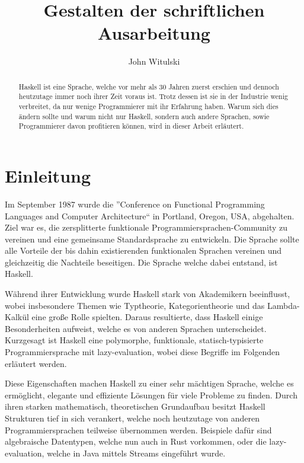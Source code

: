\documentclass{hhuarticle}
\title{Gestalten der schriftlichen Ausarbeitung}
\author{John Witulski} %
\begin{document}
  \maketitle

  \begin{abstract}
    Haskell ist eine Sprache, welche vor mehr als 30 Jahren zuerst erschien
    und dennoch heutzutage immer noch ihrer Zeit voraus ist.
    Trotz dessen ist sie in der Industrie wenig verbreitet, da nur
    wenige Programmierer mit ihr Erfahrung haben.
    Warum sich dies ändern sollte und warum nicht nur Haskell, sondern
    auch andere Sprachen, sowie Programmierer davon profitieren können,
    wird in dieser Arbeit erläutert.
  \end{abstract}

\tableofcontents


  \section{Einleitung}

  Im September 1987 wurde die
  ''Conference on Functional Programming Languages and Computer Architecture``
  in Portland, Oregon, USA, abgehalten. Ziel war es, die zersplitterte
  funktionale Programmiersprachen-Community zu vereinen und eine
  gemeinsame Standardsprache zu entwickeln.
  Die Sprache sollte alle Vorteile der bis dahin existierenden
  funktionalen Sprachen vereinen und gleichzeitig die Nachteile
  beseitigen.
  Die Sprache welche dabei entstand, ist Haskell.

  Während ihrer Entwicklung wurde Haskell stark von Akademikern beeinflusst,
  wobei insbesondere Themen wie Typtheorie, Kategorientheorie und das Lambda-Kalkül
  eine große Rolle spielten. Daraus resultierte, dass Haskell
  einige Besonderheiten aufweist, welche es von anderen Sprachen unterscheidet.
  Kurzgesagt ist Haskell eine polymorphe, funktionale, statisch-typisierte Programmiersprache mit
  lazy-evaluation, wobei diese Begriffe im Folgenden erläutert werden.

  Diese Eigenschaften machen Haskell zu einer sehr mächtigen Sprache, welche
  es ermöglicht, elegante und effiziente Lösungen für viele Probleme zu finden.
  Durch ihren starken mathematisch, theoretischen Grundaufbau besitzt Haskell
  Strukturen tief in sich verankert, welche noch heutzutage
  von anderen Programmiersprachen teilweise übernommen werden. Beispiele
  dafür sind algebraische Datentypen, welche nun auch in Rust vorkommen,
  oder die lazy-evaluation, welche in Java mittels Streams eingeführt wurde.
\end{document}
